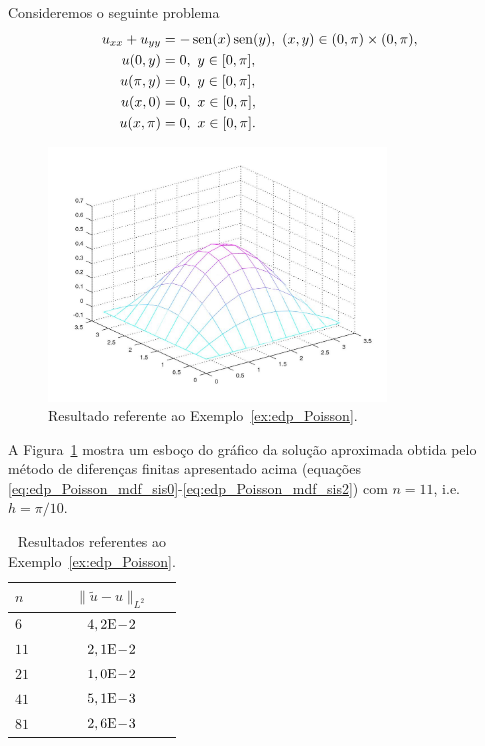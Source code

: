 \begin{ex}\label{ex:edp_Poisson}
  Consideremos o seguinte problema
  \begin{align}
    u_{xx} + u_{yy} &= -\operatorname{sen}(x)\operatorname{sen}(y),~(x, y)\in (0, \pi)\times (0, \pi),\\
    u(0, y) &= 0,~y\in [0, \pi],\\
    u(\pi, y) &= 0,~y\in [0, \pi],\\
    u(x, 0) &= 0,~x\in [0, \pi],\\
    u(x, \pi) &= 0,~x\in [0, \pi].
\end{align}


\begin{figure}[h!]
  \centering
  \includegraphics[width=0.8\textwidth]{./cap_edp/dados/ex_edp_Poisson/ex_edp_Poisson}
  \caption{Resultado referente ao Exemplo~\ref{ex:edp_Poisson}.}
  \label{fig:ex_edp_Poisson}
\end{figure}


A Figura~\ref{fig:ex_edp_Poisson} mostra um esboço do gráfico da solução aproximada obtida pelo método de diferenças finitas apresentado acima (equações \eqref{eq:edp_Poisson_mdf_sis0}-\eqref{eq:edp_Poisson_mdf_sis2}) com $n=11$, i.e. $h=\pi/10$.

\begin{table}[h!]
  \centering
  \begin{tabular}{l|c}
    $n$ & $\|\tilde{u}-u\|_{L^2}$\\\hline
    $6$ & $4,2\mathrm{E}\!-\!2$ \\
    $11$ & $2,1\mathrm{E}\!-\!2$ \\
    $21$ & $1,0\mathrm{E}\!-\!2$ \\
    $41$ & $5,1\mathrm{E}\!-\!3$ \\
    $81$ & $2,6\mathrm{E}\!-\!3$ \\\hline
  \end{tabular}
  \caption{Resultados referentes ao Exemplo~\ref{ex:edp_Poisson}.}
  \label{tab:ex_edp_Poisson}
\end{table}


\end{ex}
